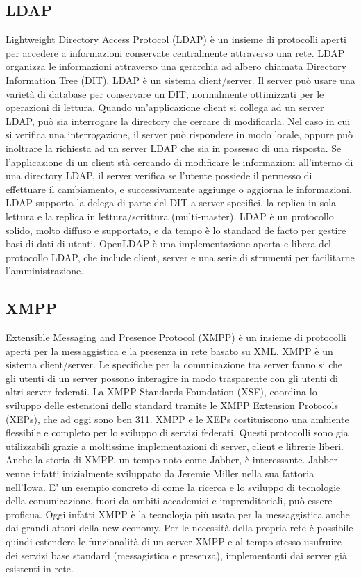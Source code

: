 \subsection{LDAP}
Lightweight Directory Access Protocol (LDAP) è un insieme di
protocolli aperti per accedere a informazioni conservate centralmente
attraverso una rete. LDAP organizza le informazioni attraverso una
gerarchia ad albero chiamata Directory Information Tree (DIT). LDAP è
un sistema client/server. Il server può usare una varietà di database
per conservare un DIT, normalmente ottimizzati per le operazioni di
lettura. Quando un'applicazione client si collega ad un server LDAP,
può sia interrogare la directory che cercare di modificarla. Nel caso
in cui si verifica una interrogazione, il server può rispondere in
modo locale, oppure può inoltrare la richiesta ad un server LDAP che
sia in possesso di una risposta. Se l'applicazione di un client stà
cercando di modificare le informazioni all'interno di una directory
LDAP, il server verifica se l'utente possiede il permesso di
effettuare il cambiamento, e successivamente aggiunge o aggiorna le
informazioni. LDAP supporta la delega di parte del DIT a server
specifici, la replica in sola lettura e la replica in
lettura/scrittura (multi-master).  LDAP è un protocollo solido, molto
diffuso e supportato, e da tempo è lo standard de facto per gestire
basi di dati di utenti. OpenLDAP è una implementazione aperta e libera
del protocollo LDAP, che include client, server e una serie di
strumenti per facilitarne l'amministrazione.

\subsection{XMPP}
Extensible Messaging and Presence Protocol (XMPP) è un insieme di
protocolli aperti per la messaggistica e la presenza in rete basato su
XML. XMPP è un sistema client/server. Le specifiche per la
comunicazione tra server fanno si che gli utenti di un server possono
interagire in modo trasparente con gli utenti di altri server
federati. La XMPP Standards Foundation (XSF), coordina lo sviluppo
delle estensioni dello standard tramite le XMPP Extension Protocols
(XEPs), che ad oggi sono ben 311. XMPP e le XEPs costituiscono una
ambiente flessibile e completo per lo sviluppo di servizi
federati. Questi protocolli sono gia utilizzabili grazie a moltissime
implementazioni di server, client e librerie liberi. Anche la storia
di XMPP, un tempo noto come Jabber, è interessante. Jabber venne
infatti inizialmente sviluppato da Jeremie Miller nella sua fattoria
nell'Iowa. E' un esempio concreto di come la ricerca e lo sviluppo di
tecnologie della comunicazione, fuori da ambiti accademici e
imprenditoriali, può essere proficua. Oggi infatti XMPP è la
tecnologia più usata per la messaggistica anche dai grandi attori
della new economy. Per le necessità della propria rete è possibile
quindi estendere le funzionalità di un server XMPP e al tempo stesso
usufruire dei servizi base standard (messagistica e presenza),
implementanti dai server già esistenti in rete.

